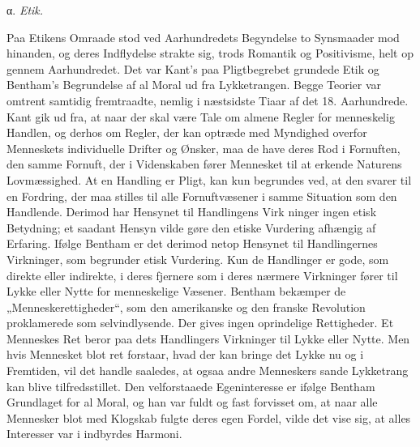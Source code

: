 \documentclass[12pt,a4paper,openany]{book}
\newcommand{\opage}[1]{\marginnote{\footnotesize\textit{[#1]}}}
\newcommand{\sectionhead}[2]{\par\bigskip\phantomsection\begin{center}#1 \textit{#2}\end{center}\addcontentsline{toc}{section}{#1 #2}\medskip\ignorespaces}
\begin{document}
\sectionhead{α.}{Etik.}

Paa Etikens Omraade stod ved Aarhundredets Begyndelse to
Synsmaader mod hinanden, og deres Indflydelse strakte sig, trods
Romantik og Positivisme, helt op gennem Aarhundredet. Det var
Kant’s paa Pligtbegrebet grundede Etik og Bentham’s Begrundelse
af al Moral ud fra Lykketrangen. Begge Teorier var omtrent samtidig
fremtraadte, nemlig i næstsidste Tiaar af det 18. Aarhundrede.
Kant gik ud fra, at naar der skal være Tale om almene Regler for
menneskelig Handlen, og derhos om Regler, der kan optræde med
Myndighed overfor Menneskets individuelle Drifter og Ønsker, maa
de have deres Rod i Fornuften, den samme Fornuft, der i Videnskaben
fører Mennesket til at erkende Naturens Lovmæssighed. At
en Handling er Pligt, kan kun begrundes ved, at den svarer til en
Fordring, der maa stilles til alle Fornuftvæsener i samme Situation
som den Handlende. Derimod har Hensynet til Handlingens Virk%
\opage{67}ninger ingen etisk Betydning; et saadant Hensyn vilde gøre den etiske
Vurdering afhængig af Erfaring. Ifølge Bentham er det derimod
netop Hensynet til Handlingernes Virkninger, som begrunder etisk
Vurdering. Kun de Handlinger er gode, som direkte eller indirekte,
i deres fjernere som i deres nærmere Virkninger fører til Lykke eller
Nytte for menneskelige Væsener. Bentham bekæmper de „Menneskerettigheder“,
som den amerikanske og den franske Revolution proklamerede
som selvindlysende. Der gives ingen oprindelige Rettigheder.
Et Menneskes Ret beror paa dets Handlingers Virkninger til
Lykke eller Nytte. Men hvis Mennesket blot ret forstaar, hvad der
kan bringe det Lykke nu og i Fremtiden, vil det handle saaledes, at
ogsaa andre Menneskers sande Lykketrang kan blive tilfredsstillet.
Den velforstaaede Egeninteresse er ifølge Bentham Grundlaget for al
Moral, og han var fuldt og fast forvisset om, at naar alle Mennesker
blot med Klogskab fulgte deres egen Fordel, vilde det vise sig,
at alles Interesser var i indbyrdes Harmoni.
\end{document}

